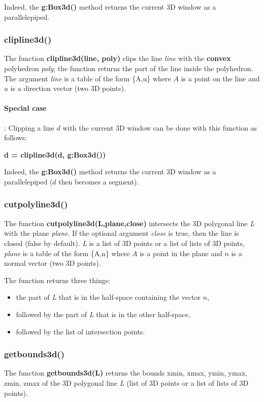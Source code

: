Indeed, the \textbf{g:Box3d()} method returns the current 3D window as a parallelepiped.

\subsubsection{clipline3d()}
The function \textbf{clipline3d(line, poly)} clips the line \emph{line} with the \textbf{convex} polyhedron \emph{poly}; the function returns the part of the line inside the polyhedron. The argument \emph{line} is a table of the form \{A,u\} where $A$ is a point on the line and $u$ is a direction vector (two 3D points).

\paragraph{Special case}: Clipping a line $d$ with the current 3D window can be done with this function as follows:

\begin{center}
\textbf{d = clipline3d(d, g:Box3d())}
\end{center}

Indeed, the \textbf{g:Box3d()} method returns the current 3D window as a parallelepiped ($d$ then becomes a segment).

\subsubsection{cutpolyline3d()}
The function \textbf{cutpolyline3d(L,plane,close)} intersects the 3D polygonal line \emph{L} with the plane \emph{plane}. If the optional argument \emph{close} is true, then the line is closed (false by default). \emph{L} is a list of 3D points or a list of lists of 3D points, \emph{plane} is a table of the form \{A,n\} where $A$ is a point in the plane and $n$ is a normal vector (two 3D points).

The function returns three things:
\begin{itemize}
\item the part of \emph{L} that is in the half-space containing the vector $n$,
\item followed by the part of \emph{L} that is in the other half-space,
\item followed by the list of intersection points.
\end{itemize}

\subsubsection{getbounds3d()}
The function \textbf{getbounds3d(L)} returns the bounds xmin, xmax, ymin, ymax, zmin, zmax of the 3D polygonal line \emph{L} (list of 3D points or a list of lists of 3D points).


